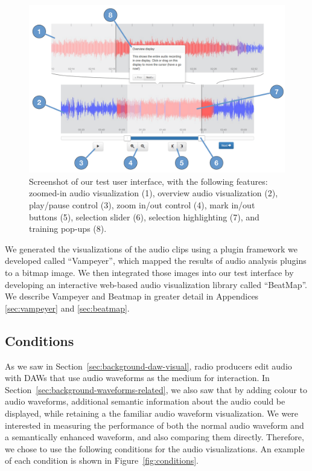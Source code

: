 \begin{figure}[h]
\centering
\includegraphics[width=\columnwidth]{figs/browser-audio-interface.pdf}
\caption[Screenshot of our test user interface.]{Screenshot of our test user interface, with the following features:
zoomed-in audio visualization (1),
overview audio visualization (2),
play/pause control (3),
zoom in/out control (4),
mark in/out buttons (5),
selection slider (6),
selection highlighting (7),
and training pop-ups (8).}
\label{fig:visualization-interface}
\end{figure}



We generated the visualizations of the audio clips using a plugin framework we developed called ``Vampeyer'', which
mapped the results of audio analysis plugins to a bitmap image. We then integrated those images into our test interface
by developing an interactive web-based audio visualization library called ``BeatMap''.  We describe Vampeyer and
Beatmap in greater detail in Appendices \ref{sec:vampeyer} and \ref{sec:beatmap}.

\subsection{Conditions}
As we saw in Section~\ref{sec:background-daw-visual}, radio producers edit audio with DAWs that use audio waveforms as
the medium for interaction. In Section~\ref{sec:background-waveforms-related}, we also saw that by adding colour to
audio waveforms, additional semantic information about the audio could be displayed, while retaining a the familiar
audio waveform visualization.  We were interested in measuring the performance of both the normal audio waveform and a
semantically enhanced waveform, and also comparing them directly.  Therefore, we chose to use the following conditions
for the audio visualizations. An example of each condition is shown in Figure~\ref{fig:conditions}.

